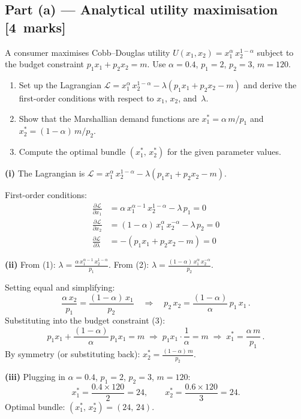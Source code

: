 \documentclass[11pt,a4paper]{article}
\newcommand{\mkpts}[1]{\hfill\textbf{[#1~marks]}}
\begin{document}
\subsection*{Part (a) --- Analytical utility maximisation \mkpts{4}}

A consumer maximises Cobb--Douglas utility $U(x_1,x_2) = x_1^{\alpha}\,x_2^{1-\alpha}$ subject to the budget constraint $p_1 x_1 + p_2 x_2 = m$.  Use $\alpha=0.4$, $p_1=2$, $p_2=3$, $m=120$.

\begin{enumerate}[label=(\roman*),nosep]
\item Set up the Lagrangian $\mathcal{L} = x_1^{\alpha}\,x_2^{1-\alpha} - \lambda(p_1 x_1 + p_2 x_2 - m)$ and derive the first-order conditions with respect to $x_1$, $x_2$, and~$\lambda$.
\item Show that the Marshallian demand functions are $x_1^* = \alpha\,m/p_1$ and $x_2^* = (1-\alpha)\,m/p_2$.
\item Compute the optimal bundle $(x_1^*,\, x_2^*)$ for the given parameter values.
\end{enumerate}

\begin{solution}
\textbf{(i)} The Lagrangian is $\mathcal{L} = x_1^{\alpha}\,x_2^{1-\alpha} - \lambda(p_1 x_1 + p_2 x_2 - m)$.

First-order conditions:
\begin{align*}
\frac{\partial \mathcal{L}}{\partial x_1} &= \alpha\, x_1^{\alpha-1}\, x_2^{1-\alpha} - \lambda\, p_1 = 0 \tag{1}\\
\frac{\partial \mathcal{L}}{\partial x_2} &= (1-\alpha)\, x_1^{\alpha}\, x_2^{-\alpha} - \lambda\, p_2 = 0 \tag{2}\\
\frac{\partial \mathcal{L}}{\partial \lambda} &= -(p_1 x_1 + p_2 x_2 - m) = 0 \tag{3}
\end{align*}

\textbf{(ii)} From (1): $\lambda = \frac{\alpha\, x_1^{\alpha-1}\, x_2^{1-\alpha}}{p_1}$.  From (2): $\lambda = \frac{(1-\alpha)\, x_1^{\alpha}\, x_2^{-\alpha}}{p_2}$.

Setting equal and simplifying:
\[
\frac{\alpha\, x_2}{p_1} = \frac{(1-\alpha)\, x_1}{p_2} \quad\Longrightarrow\quad p_2\,x_2 = \frac{(1-\alpha)}{\alpha}\,p_1\,x_1\,.
\]
Substituting into the budget constraint (3):
\[
p_1 x_1 + \frac{(1-\alpha)}{\alpha}\,p_1 x_1 = m \;\Longrightarrow\; p_1 x_1 \cdot \frac{1}{\alpha} = m \;\Longrightarrow\; \boxed{x_1^* = \frac{\alpha\, m}{p_1}}\,.
\]
By symmetry (or substituting back): $\boxed{x_2^* = \frac{(1-\alpha)\,m}{p_2}}$.

\medskip

\textbf{(iii)} Plugging in $\alpha=0.4$, $p_1=2$, $p_2=3$, $m=120$:
\[
x_1^* = \frac{0.4 \times 120}{2} = 24, \qquad x_2^* = \frac{0.6 \times 120}{3} = 24.
\]
Optimal bundle: $\boxed{(x_1^*,\, x_2^*) = (24,\, 24)}$.
\end{solution}
\end{document}
